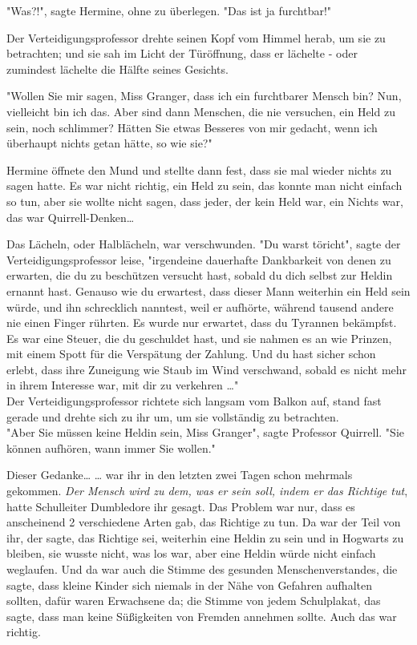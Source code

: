 {"Was?!", sagte Hermine, ohne zu überlegen. "Das ist ja furchtbar!"

Der Verteidigungsprofessor drehte seinen Kopf vom Himmel herab, um sie zu betrachten; und sie sah im Licht der Türöffnung, dass er lächelte - oder zumindest lächelte die Hälfte seines Gesichts.

"Wollen Sie mir sagen, Miss Granger, dass ich ein furchtbarer Mensch bin? Nun, vielleicht bin ich das. Aber sind dann Menschen, die nie versuchen, ein Held zu sein, noch schlimmer? Hätten Sie etwas Besseres von mir gedacht, wenn ich überhaupt nichts getan hätte, so wie sie?"

Hermine öffnete den Mund und stellte dann fest, dass sie mal wieder nichts zu sagen hatte. Es war nicht richtig, ein Held zu sein, das konnte man nicht einfach so tun, aber sie wollte nicht sagen, dass jeder, der kein Held war, ein Nichts war, das war Quirrell-Denken…

Das Lächeln, oder Halblächeln, war verschwunden. "Du warst töricht", sagte der Verteidigungsprofessor leise, "irgendeine dauerhafte Dankbarkeit von denen zu erwarten, die du zu beschützen versucht hast, sobald du dich selbst zur Heldin ernannt hast. Genauso wie du erwartest, dass dieser Mann weiterhin ein Held sein würde, und ihn schrecklich nanntest, weil er aufhörte, während tausend andere nie einen Finger rührten. Es wurde nur erwartet, dass du Tyrannen bekämpfst. Es war eine Steuer, die du geschuldet hast, und sie nahmen es an wie Prinzen, mit einem Spott für die Verspätung der Zahlung. Und du hast sicher schon erlebt, dass ihre Zuneigung wie Staub im Wind verschwand, sobald es nicht mehr in ihrem Interesse war, mit dir zu verkehren …"\\ Der Verteidigungsprofessor richtete sich langsam vom Balkon auf, stand fast gerade und drehte sich zu ihr um, um sie vollständig zu betrachten.\\ "Aber Sie müssen keine Heldin sein, Miss Granger", sagte Professor Quirrell. "Sie können aufhören, wann immer Sie wollen."

Dieser Gedanke… … war ihr in den letzten zwei Tagen schon mehrmals gekommen. \emph{Der Mensch wird zu dem, was er sein soll, indem er das Richtige tut}, hatte Schulleiter Dumbledore ihr gesagt. Das Problem war nur, dass es anscheinend 2 verschiedene Arten gab, das Richtige zu tun. Da war der Teil von ihr, der sagte, das Richtige sei, weiterhin eine Heldin zu sein und in Hogwarts zu bleiben, sie wusste nicht, was los war, aber eine Heldin würde nicht einfach weglaufen. Und da war auch die Stimme des gesunden Menschenverstandes, die sagte, dass kleine Kinder sich niemals in der Nähe von Gefahren aufhalten sollten, dafür waren Erwachsene da; die Stimme von jedem Schulplakat, das sagte, dass man keine Süßigkeiten von Fremden annehmen sollte. Auch das war richtig.

}
